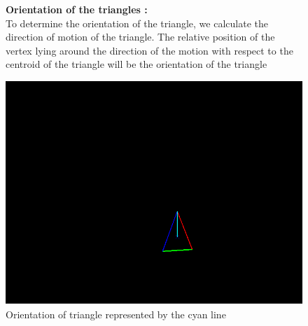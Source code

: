 \documentclass[11pt]{report}
\begin{document}
\begin{figure}[H]
\begin{minipage}{0.5 \linewidth}
\hspace*{10pt}
{\bf Orientation of the triangles :}\\
\hspace*{20pt}To determine the orientation of the triangle, we calculate the direction of motion of the triangle. The relative position of the vertex lying around the direction of the motion with respect to the centroid of the triangle will be the orientation of the triangle\\ 
\end{minipage}
\begin{minipage}{0.4 \linewidth}
\center
\includegraphics[scale=0.3]{orientation.png}
\caption{Orientation of triangle represented by the cyan line}
\end{minipage}
\end{figure}
\end{document}
